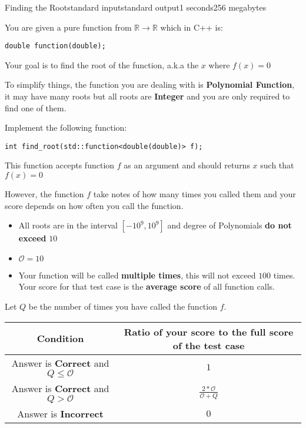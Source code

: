 \documentclass[11pt,a4paper]{article}
\begin{document}
\begin{problem}{Finding the Root}{standard input}{standard output}{1 seconds}{256 megabytes}

You are given a pure function from $\mathbb{R}\rightarrow\mathbb{R}$
which in C++ is:

\begin{verbatim}
double function(double);
\end{verbatim}

Your goal is to find the root of the function, a.k.a the $x$ where $f(x) = 0$

To simplify things, the function you are dealing with is \textbf{Polynomial Function},
it may have many roots but all roots are \textbf{Integer} and you are only
required to find one of them.

Implement the following function:

\begin{verbatim}
int find_root(std::function<double(double)> f);
\end{verbatim}

This function accepts function $f$ as an argument and should returns $x$
such that $f(x) = 0$

However, the function $f$ take notes of how many times you called them and
your score depends on how often you call the function.

\Constraints

\begin{itemize}
\item All roots are in the interval $[-10^9, 10^9]$ and degree of Polynomials \textbf{do not exceed} $10$
\item $\mathcal{O} = 10$
\item Your function will be called \textbf{multiple times}, this will not exceed $100$ times.
Your score for that test case is the \textbf{average score} of all function calls.
\end{itemize}

\Scoring

\begin{center}

Let $Q$ be the number of times you have called the function $f$.

\begin{tabular}{ | c | c | }
\hline
\textbf{Condition} & \textbf{Ratio of your score to the full score of the test case} \\
\hline
Answer is \textbf{Correct} and $Q \le \mathcal{O}$ & $1$ \\
\hline
Answer is \textbf{Correct} and $Q > \mathcal{O}$ & $\frac{2*\mathcal{O}}{\mathcal{O}+Q}$ \\
\hline
Answer is \textbf{Incorrect} & $0$ \\
\hline
\end{tabular}
\end{center}


\end{problem}
\end{document}
